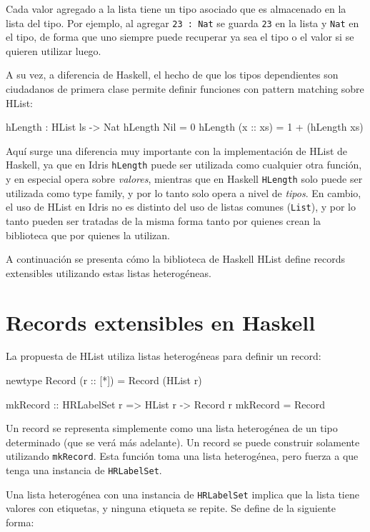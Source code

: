 Cada valor agregado a la lista tiene un tipo asociado que es almacenado en la lista del tipo. Por ejemplo, al agregar \texttt{23 : Nat} se guarda \texttt{23} en la lista y \texttt{Nat} en el tipo, de forma que uno siempre puede recuperar ya sea el tipo o el valor si se quieren utilizar luego.

A su vez, a diferencia de Haskell, el hecho de que los tipos dependientes son ciudadanos de primera clase permite definir funciones con pattern matching sobre HList:

\begin{code}
hLength : HList ls -> Nat
hLength Nil = 0
hLength (x :: xs) = 1 + (hLength xs)
\end{code}

Aquí surge una diferencia muy importante con la implementación de HList de Haskell, ya que en Idris \texttt{hLength} puede ser utilizada como cualquier otra función, y en especial opera sobre \textit{valores}, mientras que en Haskell \texttt{HLength} solo puede ser utilizada como type family, y por lo tanto solo opera a nivel de \textit{tipos}. En cambio, el uso de HList en Idris no es distinto del uso de listas comunes (\texttt{List}), y por lo tanto pueden ser tratadas de la misma forma tanto por quienes crean la biblioteca que por quienes la utilizan.

A continuación se presenta cómo la biblioteca de Haskell HList define records extensibles utilizando estas listas heterogéneas.

\section{Records extensibles en Haskell}

La propuesta de HList \cite{Kiselyov:2004:STH:1017472.1017488} utiliza listas heterogéneas para definir un record:

\begin{code}
newtype Record (r :: [*]) = Record (HList r)

mkRecord :: HRLabelSet r => HList r -> Record r
mkRecord = Record
\end{code}

Un record se representa simplemente como una lista heterogénea de un tipo determinado (que se verá más adelante). Un record se puede construir solamente utilizando \texttt{mkRecord}. Esta función toma una lista heterogénea, pero fuerza a que tenga una instancia de \texttt{HRLabelSet}.

Una lista heterogénea con una instancia de \texttt{HRLabelSet} implica que la lista tiene valores con etiquetas, y ninguna etiqueta se repite. Se define de la siguiente forma:

